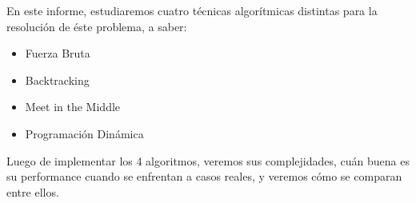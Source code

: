 En este informe, estudiaremos cuatro técnicas algorítmicas distintas para la resolución de éste problema, a saber:
\begin{itemize}
\item Fuerza Bruta
\item Backtracking
\item Meet in the Middle
\item Programación Dinámica
\end{itemize}

Luego de implementar los 4 algoritmos, veremos sus complejidades, cuán buena es su performance cuando se enfrentan a casos reales, y veremos cómo se comparan entre ellos.
\label{sec:introduccion}
